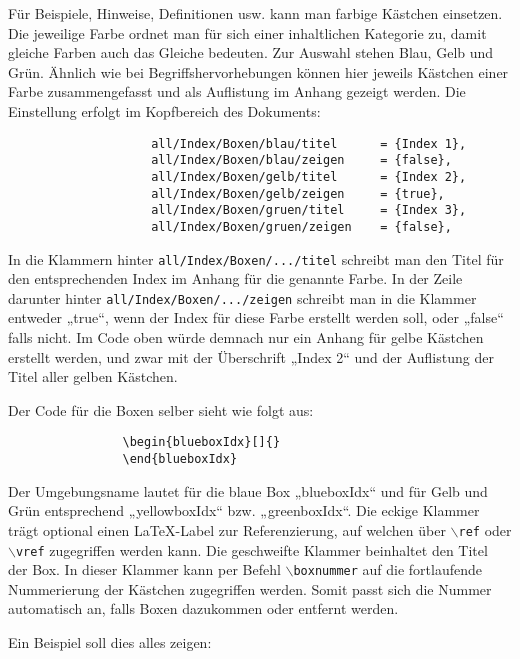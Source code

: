 				Für Beispiele, Hinweise, Definitionen usw. kann man farbige Kästchen einsetzen. Die jeweilige Farbe ordnet man für sich einer inhaltlichen Kategorie zu, damit gleiche Farben auch das Gleiche bedeuten. Zur Auswahl stehen Blau, Gelb und Grün. Ähnlich wie bei Begriffshervorhebungen können hier jeweils Kästchen einer Farbe zusammengefasst und als Auflistung im Anhang gezeigt werden. Die Einstellung erfolgt im Kopfbereich des Dokuments:

				\begin{verbatim}
					all/Index/Boxen/blau/titel      = {Index 1},
					all/Index/Boxen/blau/zeigen     = {false},
					all/Index/Boxen/gelb/titel      = {Index 2},
					all/Index/Boxen/gelb/zeigen     = {true},
					all/Index/Boxen/gruen/titel     = {Index 3},
					all/Index/Boxen/gruen/zeigen    = {false},
				\end{verbatim}

				In die Klammern hinter \texttt{all/Index/Boxen/.../titel} schreibt man den Titel für den entsprechenden Index im Anhang für die genannte Farbe. In der Zeile darunter hinter \texttt{all/Index/Boxen/.../zeigen} schreibt man in die Klammer entweder „true“, wenn der Index für diese Farbe erstellt werden soll, oder „false“ falls nicht. Im Code oben würde demnach nur ein Anhang für gelbe Kästchen erstellt werden, und zwar mit der Überschrift „Index 2“ und der Auflistung der Titel aller gelben Kästchen.

				Der Code für die Boxen selber sieht wie folgt aus:

				\begin{verbatim}
				\begin{blueboxIdx}[]{}
				\end{blueboxIdx}
				\end{verbatim}

				Der Umgebungsname lautet für die blaue Box „blueboxIdx“ und für Gelb und Grün entsprechend „yellowboxIdx“ bzw. „greenboxIdx“. Die eckige Klammer trägt optional einen \LaTeX{}-Label zur Referenzierung, auf welchen über \texttt{$\backslash$ref} oder \texttt{$\backslash$vref} zugegriffen werden kann. Die geschweifte Klammer beinhaltet den Titel der Box. In dieser Klammer kann per Befehl \texttt{$\backslash$boxnummer} auf die fortlaufende Nummerierung der Kästchen zugegriffen werden. Somit passt sich die Nummer automatisch an, falls Boxen dazukommen oder entfernt werden.

				Ein Beispiel soll dies alles zeigen: \newline

